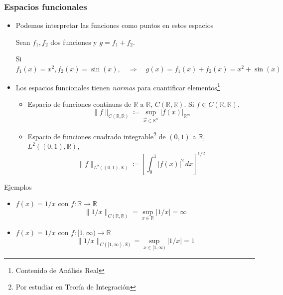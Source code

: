\documentclass[12pt,aspectratio=169,xcolor=dvipsnames]{beamer}
\newcommand{\R}{\mathbb{R}}
\begin{document}
\begin{frame}[t]\frametitle{Espacios funcionales}
    \begin{itemize}
        \item<+-> Podemos interpretar las funciones como puntos en estos espacios
            \begin{exampleblock}{}
                Sean $f_1, f_2$ dos funciones y $g = f_1 + f_2$. 

                Si $f_1(x) = x^2, f_2(x) = \sin(x), \quad\Rightarrow\quad g(x) = f_1(x)+f_2(x) = x^2+\sin(x)$
            \end{exampleblock}
        \item<+-> Los espacios funcionales tienen \emph{normas} para cuantificar elementos\footnote{Contenido de Análisis Real}
            \begin{itemize}
                \item<+-> Espacio de funciones continuas de $\R$ a $\R$, $C(\R, \R)$. Si $f\in C(\R, \R)$, 
                    $$ \| f \|_{C(\R, \R)} \coloneqq \sup_{\vec x\in  \R^n}|f(x)|_{\R^m} $$
                \item<+-> Espacio de funciones cuadrado integrable\footnote{Por estudiar en Teoría de Integración} de $(0,1)$ a $\R$, $L^2((0,1), \R)$,
                    $$ \| f \|_{L^2((0,1), \R)} \coloneqq \left[ \int_0^1|f(x)|^2\,dx \right]^{1/2} $$
            \end{itemize}
    \end{itemize}
\end{frame}
\begin{frame}{Ejemplos}
    \begin{itemize}
        \item<+-> $f(x) = 1/x$ con $f:\R \to \R$
            $$ \| 1/x \|_{C(\R, \R)} =\sup_{x\in \R} |1/x| = \infty$$
        \item<+-> $f(x) = 1/x$ con $f:[1,\infty) \to \R$
            $$\|1/x\|_{C([1,\infty),\R)} = \sup_{x\in [1,\infty)}|1/x| = 1 $$
    \end{itemize}



\end{frame}
\end{document}
